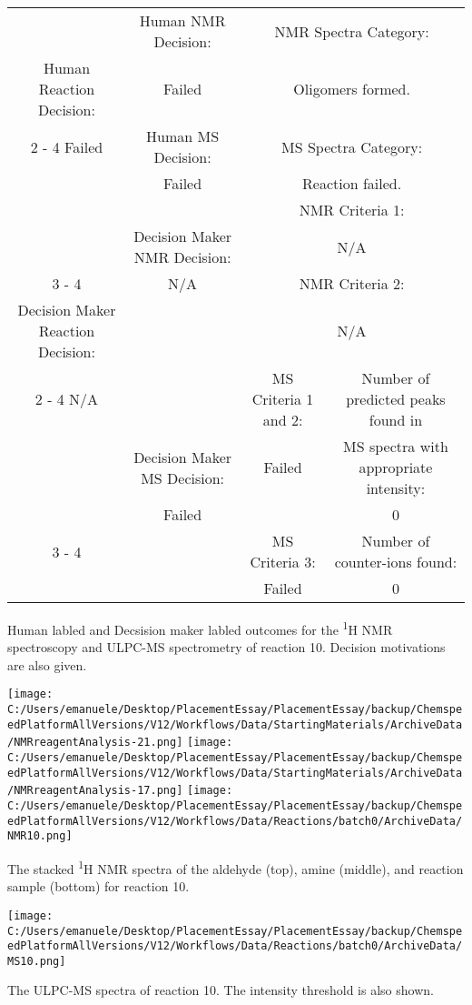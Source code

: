 \documentclass{article}%
\begin{document}
\begin{Decision Table}[H]%
\begin{tabular}{|c|c|c|c|}%
\hline%
&Human NMR Decision:&\multicolumn{2}{|c|}{NMR Spectra Category:}\\%
Human Reaction Decision:&Failed&\multicolumn{2}{|c|}{Oligomers formed.}\\%
\cline{2%
-%
4}%
Failed&Human MS Decision:&\multicolumn{2}{|c|}{MS Spectra Category:}\\%
&Failed&\multicolumn{2}{|c|}{Reaction failed.}\\%
\hline%
&&\multicolumn{2}{|c|}{NMR Criteria 1:}\\%
&Decision Maker NMR Decision:&\multicolumn{2}{|c|}{N/A}\\%
\cline{3%
-%
4}%
&N/A&\multicolumn{2}{|c|}{NMR Criteria 2:}\\%
Decision Maker Reaction Decision:&&\multicolumn{2}{|c|}{N/A}\\%
\cline{2%
-%
4}%
N/A&&MS Criteria 1 and 2:&Number of predicted peaks found in\\%
&Decision Maker MS Decision:&Failed&MS spectra with appropriate intensity:\\%
&Failed&&0\\%
\cline{3%
-%
4}%
&&MS Criteria 3:&Number of counter{-}ions found:\\%
&&Failed&0\\%
\hline%
\end{tabular}%
\caption{Human labled and Decsision maker labled outcomes for the \textsuperscript{1}H NMR spectroscopy and ULPC-MS spectrometry of reaction 10. Decision motivations are also given.}%
\end{Decision Table}%
\begin{NMR Spectra}[H]%
\begin{center}%
\texttt{[image: C:/Users/emanuele/Desktop/PlacementEssay/PlacementEssay/backup/ChemspeedPlatformAllVersions/V12/Workflows/Data/StartingMaterials/ArchiveData/NMRreagentAnalysis-21.png]}\hfill%
\texttt{[image: C:/Users/emanuele/Desktop/PlacementEssay/PlacementEssay/backup/ChemspeedPlatformAllVersions/V12/Workflows/Data/StartingMaterials/ArchiveData/NMRreagentAnalysis-17.png]}\hfill%
\texttt{[image: C:/Users/emanuele/Desktop/PlacementEssay/PlacementEssay/backup/ChemspeedPlatformAllVersions/V12/Workflows/Data/Reactions/batch0/ArchiveData/NMR10.png]}\hfill%
\end{center}%
\caption{The stacked \textsuperscript{1}H NMR spectra of the aldehyde (top), amine (middle), and reaction sample (bottom) for reaction 10.}%
\end{NMR Spectra}%
\begin{MS Spectra}[H]%
\begin{center}%
\texttt{[image: C:/Users/emanuele/Desktop/PlacementEssay/PlacementEssay/backup/ChemspeedPlatformAllVersions/V12/Workflows/Data/Reactions/batch0/ArchiveData/MS10.png]}\hfill%
\end{center}%
\caption{The ULPC-MS spectra of reaction 10. The intensity threshold is also shown.}%
\end{MS Spectra}%
\end{document}

